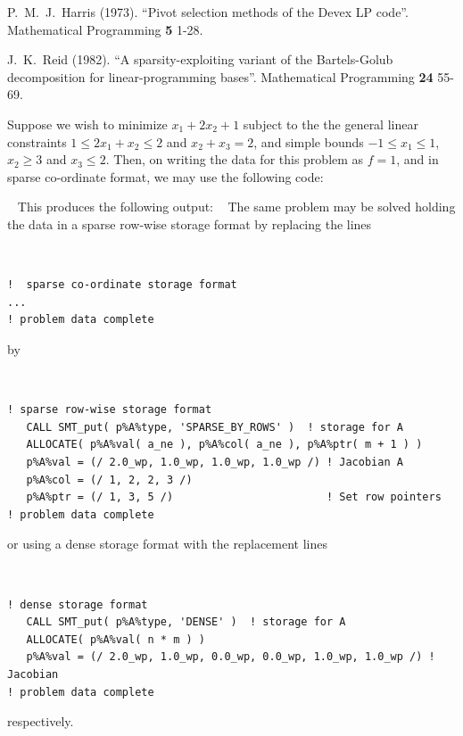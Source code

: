 \documentclass{galahad}
\begin{document}
\noindent
P.\ M.\ J.\ Harris (1973).
``Pivot selection methods of the {D}evex {LP} code''.
Mathematical Programming {\bf 5} 1-28.
\vspace*{1mm}

\noindent
J.\ K.\ Reid (1982).
``A sparsity-exploiting variant of the {B}artels-{G}olub
decomposition for linear-programming bases''.
Mathematical Programming {\bf 24} 55-69.
\vspace*{1mm}


\galexample
Suppose we wish to minimize
$x_1 + 2 x_2 + 1$
subject to the the general linear constraints
$1 \leq  2 x_{1}  +  x_{2}  \leq  2$ and
$x_{2}  +  x_{3}  =  2$, and simple bounds
$-1  \leq  x_{1}  \leq  1$, $x_2 \geq 3$ and $x_{3}  \leq  2$.
Then, on writing the data for this problem as $f = 1$,
and
in sparse co-ordinate format,
we may use the following code:

{\tt \small
\VerbatimInput{\packageexample}
}
\noindent
This produces the following output:
{\tt \small
\VerbatimInput{\packageresults}
}
\noindent
The same problem may be solved holding the data in
a sparse row-wise storage format by replacing the lines
{\tt \small
\begin{verbatim}
!  sparse co-ordinate storage format
...
! problem data complete
\end{verbatim}
}
\noindent
by
{\tt \small
\begin{verbatim}
! sparse row-wise storage format
   CALL SMT_put( p%A%type, 'SPARSE_BY_ROWS' )  ! storage for A
   ALLOCATE( p%A%val( a_ne ), p%A%col( a_ne ), p%A%ptr( m + 1 ) )
   p%A%val = (/ 2.0_wp, 1.0_wp, 1.0_wp, 1.0_wp /) ! Jacobian A
   p%A%col = (/ 1, 2, 2, 3 /)
   p%A%ptr = (/ 1, 3, 5 /)                        ! Set row pointers
! problem data complete
\end{verbatim}
}
\noindent
or using a dense storage format with the replacement lines
{\tt \small
\begin{verbatim}
! dense storage format
   CALL SMT_put( p%A%type, 'DENSE' )  ! storage for A
   ALLOCATE( p%A%val( n * m ) )
   p%A%val = (/ 2.0_wp, 1.0_wp, 0.0_wp, 0.0_wp, 1.0_wp, 1.0_wp /) ! Jacobian
! problem data complete
\end{verbatim}
}
\noindent
respectively.
\end{document}
